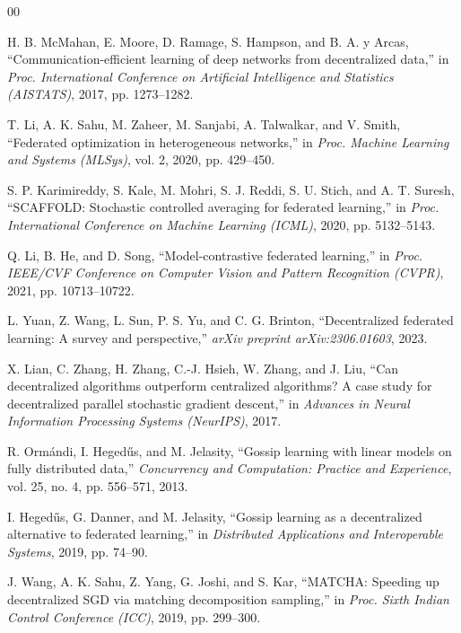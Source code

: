 \documentclass[conference]{IEEEtran}
\begin{document}
\begin{thebibliography}{00}

H. B. McMahan, E. Moore, D. Ramage, S. Hampson, and B. A. y Arcas, ``Communication-efficient learning of deep networks from decentralized data,'' in \emph{Proc. International Conference on Artificial Intelligence and Statistics (AISTATS)}, 2017, pp. 1273--1282.

T. Li, A. K. Sahu, M. Zaheer, M. Sanjabi, A. Talwalkar, and V. Smith, ``Federated optimization in heterogeneous networks,'' in \emph{Proc. Machine Learning and Systems (MLSys)}, vol. 2, 2020, pp. 429--450.

S. P. Karimireddy, S. Kale, M. Mohri, S. J. Reddi, S. U. Stich, and A. T. Suresh, ``SCAFFOLD: Stochastic controlled averaging for federated learning,'' in \emph{Proc. International Conference on Machine Learning (ICML)}, 2020, pp. 5132--5143.

Q. Li, B. He, and D. Song, ``Model-contrastive federated learning,'' in \emph{Proc. IEEE/CVF Conference on Computer Vision and Pattern Recognition (CVPR)}, 2021, pp. 10713--10722.

L. Yuan, Z. Wang, L. Sun, P. S. Yu, and C. G. Brinton, ``Decentralized federated learning: A survey and perspective,'' \emph{arXiv preprint arXiv:2306.01603}, 2023.

X. Lian, C. Zhang, H. Zhang, C.-J. Hsieh, W. Zhang, and J. Liu, ``Can decentralized algorithms outperform centralized algorithms? A case study for decentralized parallel stochastic gradient descent,'' in \emph{Advances in Neural Information Processing Systems (NeurIPS)}, 2017.

R. Orm\'{a}ndi, I. Heged\H{u}s, and M. Jelasity, ``Gossip learning with linear models on fully distributed data,'' \emph{Concurrency and Computation: Practice and Experience}, vol. 25, no. 4, pp. 556--571, 2013.

I. Heged\H{u}s, G. Danner, and M. Jelasity, ``Gossip learning as a decentralized alternative to federated learning,'' in \emph{Distributed Applications and Interoperable Systems}, 2019, pp. 74--90.

J. Wang, A. K. Sahu, Z. Yang, G. Joshi, and S. Kar, ``MATCHA: Speeding up decentralized SGD via matching decomposition sampling,'' in \emph{Proc. Sixth Indian Control Conference (ICC)}, 2019, pp. 299--300.


\end{thebibliography}
\end{document}
